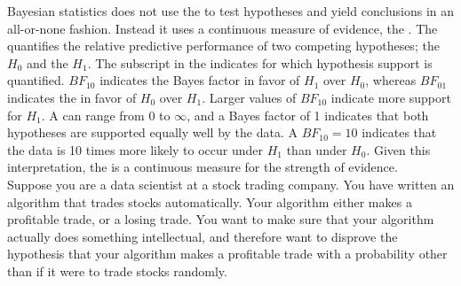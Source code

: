 \setcounter{chapter}{8}
\setcounter{section}{4}
\setcounter{question}{0}



Bayesian statistics does not use the  to test hypotheses and yield conclusions in an all-or-none fashion. Instead it uses a continuous measure of evidence, the . The  quantifies the relative predictive performance of two competing hypotheses; the  $H_0$ and the  $H_1$. The subscript in the  indicates for which hypothesis support is quantified. $BF_{10}$ indicates the Bayes factor in favor of $H_1$ over $H_0$, whereas $BF_{01}$ indicates the  in favor of $H_0$ over $H_1$. Larger values of $BF_{10}$ indicate more support for $H_1$. A  can range from 0 to $\infty$, and a Bayes factor of 1 indicates that both hypotheses are supported equally well by the data. A $BF_{10} = 10$ indicates that the data is 10 times more likely to occur under $H_1$ than under $H_0$. Given this interpretation, the  is a continuous measure for the strength of evidence. \\

Suppose you are a data scientist at a stock trading company. You have written an algorithm that trades stocks automatically. Your algorithm either makes a profitable trade, or a losing trade. You want to make sure that your algorithm actually does something intellectual, and therefore want to disprove the hypothesis that your algorithm makes a profitable trade with a probability other than if it were to trade stocks randomly. \\


\hypothesesbox


